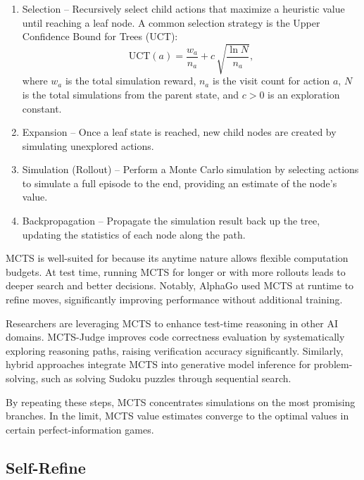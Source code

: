 \begin{enumerate}
    \item Selection – Recursively select child actions that maximize a heuristic value until reaching a leaf node. A common selection strategy is the Upper Confidence Bound for Trees (UCT):
    \[
    \text{UCT}(a) = \frac{w_a}{n_a} + c\,\sqrt{\frac{\ln N}{n_a}},
    \]
    where $w_a$ is the total simulation reward, $n_a$ is the visit count for action $a$, $N$ is the total simulations from the parent state, and $c>0$ is an exploration constant.
    
    \item Expansion – Once a leaf state is reached, new child nodes are created by simulating unexplored actions.
    
    \item Simulation (Rollout) – Perform a Monte Carlo simulation by selecting actions to simulate a full episode to the end, providing an estimate of the node's value.
    
    \item Backpropagation – Propagate the simulation result back up the tree, updating the statistics of each node along the path.
\end{enumerate}

MCTS is well-suited for \TTS because its anytime nature allows flexible computation budgets. At test time, running MCTS for longer or with more rollouts leads to deeper search and better decisions. Notably, AlphaGo used MCTS at runtime to refine moves, significantly improving performance without additional training.

Researchers are leveraging MCTS to enhance test-time reasoning in other AI domains. MCTS-Judge improves code correctness evaluation by systematically exploring reasoning paths, raising verification accuracy significantly. Similarly, hybrid approaches integrate MCTS into generative model inference for problem-solving, such as solving Sudoku puzzles through sequential search.


By repeating these steps, MCTS concentrates simulations on the most promising branches. In the limit, MCTS value estimates converge to the optimal values in certain perfect-information games.


\subsection{Self-Refine}

